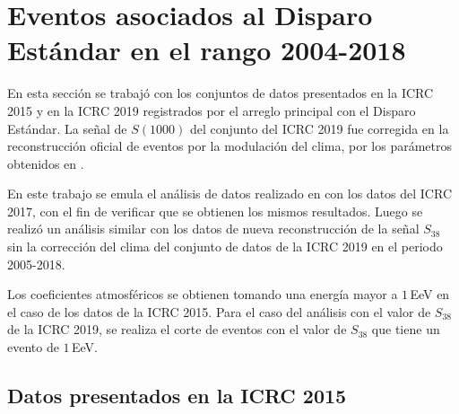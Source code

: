 
\section{Eventos asociados al Disparo Estándar en el rango 2004-2018}\label{Stan_modulacion}	
	
En esta sección se trabajó con los conjuntos de datos  presentados en la ICRC 2015  y  en la ICRC 2019 registrados por el arreglo principal con el Disparo Estándar. La señal de $S(1000)$ del conjunto del ICRC 2019 fue corregida en la reconstrucción oficial de eventos por la modulación del clima, por los parámetros obtenidos en \cite{aab2017impact}. 

En este trabajo se emula el análisis de datos realizado en \cite{aab2017impact} con los datos del ICRC 2017, con el fin de verificar que se obtienen los mismos resultados. Luego se realizó un análisis similar con los datos de nueva reconstrucción de la señal $S_{38}$ sin la corrección del clima  del conjunto de datos de la ICRC 2019 en el periodo 2005-2018. 

Los coeficientes atmosféricos se obtienen tomando una energía mayor a $1\,$EeV en el caso de los datos de la ICRC 2015. Para el caso del análisis con el valor de $S_{38}$ de la ICRC 2019, se realiza el corte de eventos con el valor de $S_{38}$  que tiene un evento de $1\,$EeV.  


\subsection{Datos presentados en la ICRC 2015}\label{icrc2015}

